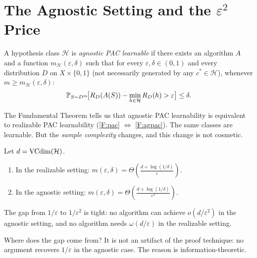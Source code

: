 \section{The Agnostic Setting and the \texorpdfstring{$\varepsilon^2$}{epsilon-squared} Price}
\label{sec:agnostic}

\begin{defn}
\label{def:agnostic-pac}
A hypothesis class $\mathcal{H}$ is \emph{agnostic PAC learnable} if there
exists an algorithm $A$ and a function $m_\mathcal{H}(\varepsilon, \delta)$
such that for every $\varepsilon, \delta \in (0,1)$ and every distribution $D$
on $X \times \{0,1\}$ (not necessarily generated by any $c^* \in \mathcal{H}$),
whenever $m \geq m_\mathcal{H}(\varepsilon, \delta)$:
\[
  \mathbb{P}_{S \sim D^m}\!\bigl[
    R_D(A(S)) - \min_{h \in \mathcal{H}} R_D(h) > \varepsilon
  \bigr] \leq \delta.
\]
\end{defn}

The Fundamental Theorem tells us that agnostic PAC learnability is
equivalent to realizable PAC learnability (\ref{F:pac} $\Leftrightarrow$
\ref{F:agpac}).  The same classes are learnable.  But the \emph{sample
complexity} changes, and this change is not cosmetic.

\begin{thm}
\label{thm:agnostic-gap}
Let $d = \mathrm{VCdim}(\mathcal{H})$.
\begin{enumerate}[label=(\alph*)]
\item In the realizable setting:
  $m(\varepsilon, \delta) = \Theta\!\left(\frac{d +
  \log(1/\delta)}{\varepsilon}\right)$.
\item In the agnostic setting:
  $m(\varepsilon, \delta) = \Theta\!\left(\frac{d +
  \log(1/\delta)}{\varepsilon^2}\right)$.
\end{enumerate}
The gap from $1/\varepsilon$ to $1/\varepsilon^2$ is tight: no algorithm can
achieve $o(d/\varepsilon^2)$ in the agnostic setting, and no algorithm needs
$\omega(d/\varepsilon)$ in the realizable setting.
\end{thm}

Where does the gap come from?  It is not an artifact of the proof technique:
no argument recovers $1/\varepsilon$ in the agnostic case.  The reason is
information-theoretic.

